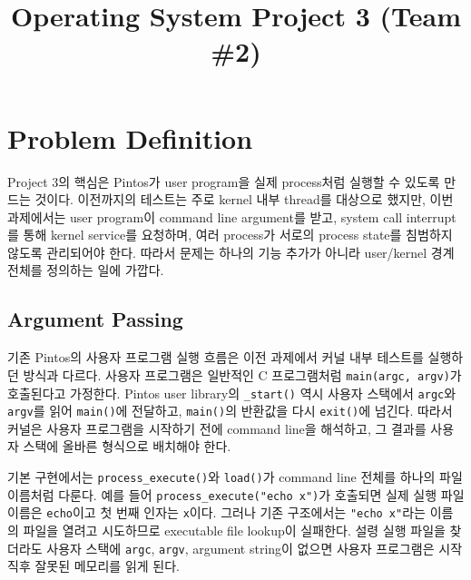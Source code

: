 \documentclass[conference]{IEEEtran}
\newcommand{\codefont}[1]{\texttt{\color{darkmagenta}#1}}
\begin{document}
\title{Operating System Project 3 (Team \#2)}

\author{
\and
{}
}
\maketitle

\section{Problem Definition}

Project 3의 핵심은 Pintos가 user program을 실제 process처럼 실행할 수 있도록 만드는 것이다. 이전까지의 테스트는 주로 kernel 내부 thread를 대상으로 했지만, 이번 과제에서는 user program이 command line argument를 받고, system call interrupt를 통해 kernel service를 요청하며, 여러 process가 서로의 process state를 침범하지 않도록 관리되어야 한다. 따라서 문제는 하나의 기능 추가가 아니라 user/kernel 경계 전체를 정의하는 일에 가깝다.

\subsection{Argument Passing}

기존 Pintos의 사용자 프로그램 실행 흐름은 이전 과제에서 커널 내부 테스트를 실행하던 방식과 다르다. 사용자 프로그램은 일반적인 C 프로그램처럼 \codefont{main(argc, argv)}가 호출된다고 가정한다. Pintos user library의 \codefont{\_start()} 역시 사용자 스택에서 \codefont{argc}와 \codefont{argv}를 읽어 \codefont{main()}에 전달하고, \codefont{main()}의 반환값을 다시 \codefont{exit()}에 넘긴다. 따라서 커널은 사용자 프로그램을 시작하기 전에 command line을 해석하고, 그 결과를 사용자 스택에 올바른 형식으로 배치해야 한다.

기본 구현에서는 \codefont{process\_execute()}와 \codefont{load()}가 command line 전체를 하나의 파일 이름처럼 다룬다. 예를 들어 \codefont{process\_execute("echo x")}가 호출되면 실제 실행 파일 이름은 \codefont{echo}이고 첫 번째 인자는 \codefont{x}이다. 그러나 기존 구조에서는 \codefont{"echo x"}라는 이름의 파일을 열려고 시도하므로 executable file lookup이 실패한다. 설령 실행 파일을 찾더라도 사용자 스택에 \codefont{argc}, \codefont{argv}, argument string이 없으면 사용자 프로그램은 시작 직후 잘못된 메모리를 읽게 된다.
\end{document}
